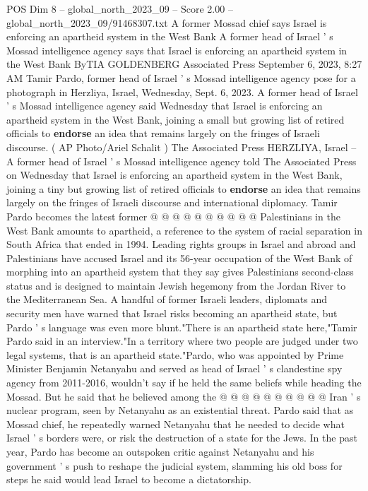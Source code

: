 \begin{textsample}{POS Dim 8 – global\_north\_2023\_09 – Score 2.00 – global\_north\_2023\_09/91468307.txt}  \label{ex:f8_pos_301}
A former Mossad chief says Israel is enforcing an apartheid system in the West Bank A former head of Israel ' s Mossad intelligence agency says that Israel is enforcing an apartheid system in the West Bank ByTIA GOLDENBERG Associated Press September 6, 2023, 8:27 AM Tamir Pardo, former head of Israel ' s Mossad intelligence agency pose for a photograph in Herzliya, Israel, Wednesday, Sept. 6, 2023.
A former head of Israel ' s Mossad intelligence agency said Wednesday that Israel is enforcing an apartheid system in the West Bank, joining a small but growing list of retired officials to \textbf{endorse} an idea that remains largely on the fringes of Israeli discourse. ( AP Photo/Ariel Schalit ) The Associated Press HERZLIYA, Israel -- A former head of Israel ' s Mossad intelligence agency told The Associated Press on Wednesday that Israel is enforcing an apartheid system in the West Bank, joining a tiny but growing list of retired officials to \textbf{endorse} an idea that remains largely on the fringes of Israeli discourse and international diplomacy.
Tamir Pardo becomes the latest former @ @ @ @ @ @ @ @ @ @ Palestinians in the West Bank amounts to apartheid, a reference to the system of racial separation in South Africa that ended in 1994.
Leading rights groups in Israel and abroad and Palestinians have accused Israel and its 56-year occupation of the West Bank of morphing into an apartheid system that they say gives Palestinians second-class status and is designed to maintain Jewish hegemony from the Jordan River to the Mediterranean Sea.
A handful of former Israeli leaders, diplomats and security men have warned that Israel risks becoming an apartheid state, but Pardo ' s language was even more blunt."There is an apartheid state here,"Tamir Pardo said in an interview."In a territory where two people are judged under two legal systems, that is an apartheid state."Pardo, who was appointed by Prime Minister Benjamin Netanyahu and served as head of Israel ' s clandestine spy agency from 2011-2016, wouldn't say if he held the same beliefs while heading the Mossad.
But he said that he believed among the @ @ @ @ @ @ @ @ @ @ Iran ' s nuclear program, seen by Netanyahu as an existential threat.
Pardo said that as Mossad chief, he repeatedly warned Netanyahu that he needed to decide what Israel ' s borders were, or risk the destruction of a state for the Jews.
In the past year, Pardo has become an outspoken critic against Netanyahu and his government ' s push to reshape the judicial system, slamming his old boss for steps he said would lead Israel to become a dictatorship.

\end{textsample}
